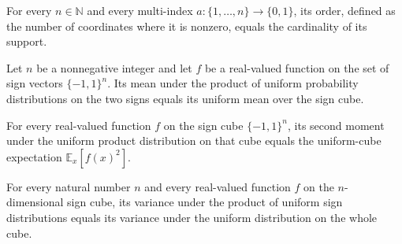 \begin{theorem}
\label{FABL.signMultiIndex_order}
\leanok
{}
For every $n\in\mathbb N$ and every multi-index $a:\{1,\ldots,n\}\to\{0,1\}$, its order,
defined as the number of coordinates where it is nonzero, equals the cardinality of its
support.
\end{theorem}

\begin{theorem}
\label{FABL.productMean_uniformSign}
\leanok
{}
Let $n$ be a nonnegative integer and let $f$ be a real-valued function on the set of
sign vectors $\{−1,1\}^n$. Its mean under the product of uniform probability
distributions on the two signs equals its uniform mean over the sign cube.
\end{theorem}

\begin{theorem}
\label{FABL.productSecondMoment_uniformSign}
\leanok
{}
For every real-valued function $f$ on the sign cube $\{−1,1\}^n$, its second moment
under the uniform product distribution on that cube equals the uniform-cube expectation
$\mathbb{E}_x[f(x)^2]$.
\end{theorem}

\begin{theorem}
\label{FABL.productVariance_uniformSign}
\leanok
{}
For every natural number $n$ and every real-valued function $f$ on the $n$-dimensional
sign cube, its variance under the product of uniform sign distributions equals its
variance under the uniform distribution on the whole cube.
\end{theorem}

